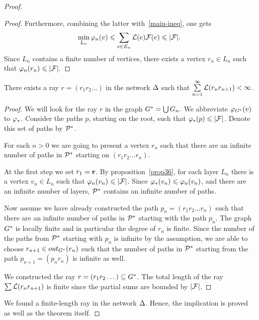 \documentclass[12pt,oneside,a4paper]{amsart}
\begin{document}
\begin{proof}
\begin{proof}
            Furthermore, combining the latter with~\eqref{main-ineq}, one gets
              \[
              \min_{L_n} \phi_n(v) \leq \sum_{e \in E_n} \len(e) \flowpos(e) \leq \lvert\flowpos\rvert.
              \]
            Since $L_n$ contains a finite number of vertices, there exists a vertex $r_n \in L_n$ such that
              $\phi_n(r_n) \leq \lvert\flowpos\rvert.$
          \end{proof}
          \begin{prop}
            There exists a ray $r=(r_1 r_2\dots)$ in the network $\net$ such that $\sum\limits_{n=1}^\infty \len(r_n r_{n+1}) < \infty$.
          \end{prop}
          \begin{proof}
            We will look for the ray $r$ in the graph $\gstar = \bigcup G_n.$
            We abbreviate $\phi_{\gstar}(v)$ to $\phistar$.
            Consider the paths $p$, starting on the root, such that $\phistar(p) \leq \lvert\flowpos\rvert$.
            Denote this set of paths by $\cal{P}^*$.

            For each $n > 0$ we are going to present a vertex $r_n$ such that there are an infinite number of paths
              in $\cal{P}^*$ starting on $(r_1 r_2 \dots r_n)$.

            At the first step we set $r_1 = \root$.
            By proposition~\ref{prop36}, for each layer $L_n$ there is a vertex $v_n \in L_n$ such that
              $\phi_n(v_n) \leq \lvert\flowpos\rvert$.
            Since $\phistar(v_n) \leq \phi_n(v_n)$, and there are an infinite number of layers,
              $\cal{P}^*$ contains an infinite number of paths.

            Now assume we have already constructed the path $p_n = (r_1 r_2\dots r_n)$ such that
              there are an infinite number of paths in $\cal{P}^*$ starting with the path $p_n$.
            The graph $\gstar$ is locally finite and in particular the degree of $r_n$ is finite.
            Since the number of the paths from $\cal{P}^*$ starting with $p_n$ is infinite by the assumption,
              we are able to choose $r_{n+1} \in \eout_{G^*}(r_n)$ such that the number of paths in $\cal{P}^*$ starting from
              the path $p_{n+1}= (p_n r_n)$ is infinite as well.

            We constructed the ray $r = (r_1 r_2 \dots) \subseteq \gstar$.
            The total length of the ray $\sum \len(r_n r_{n+1})$ is finite
              since the partial sums are bounded by $\lvert \flowpos \rvert$.
          \end{proof}
          We found a finite-length ray in the network $\net$.
          Hence, the implication is proved as well as the theorem itself.
      \end{proof}
\end{document}
